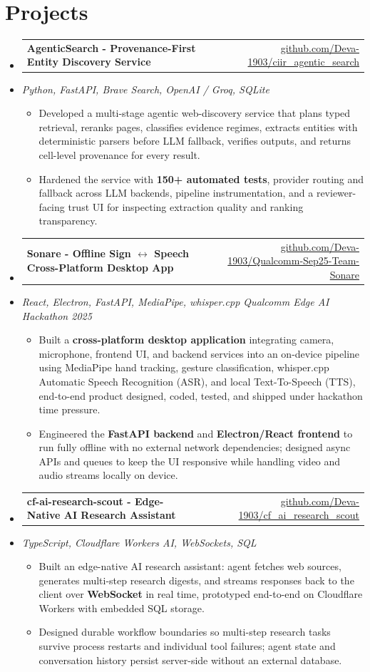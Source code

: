 \documentclass[letterpaper,10pt]{article}
\makeatletter
\newcommand{\resumeItem}[1]{
  \item\small{#1\vspace{-1pt}}
}
\newcommand{\resumeProjectHeading}[2]{
    \item
    \begin{tabular*}{0.985\textwidth}[t]{l@{\extracolsep{\fill}}r}
      \small\textbf{#1} & \small #2 \\
    \end{tabular*}\vspace{-5pt}
}
\newcommand{\resumeProjectSubheading}[1]{
  \vspace{-2pt}\item[] {\small\textcolor{ResumeSlate}{\emph{#1}}}\vspace{-3pt}
}
\newcommand{\resumeSubHeadingListStart}{\begin{itemize}[leftmargin=0.0in, label={}, itemsep=2pt, topsep=2pt]}
\newcommand{\resumeSubHeadingListEnd}{\end{itemize}}
\newcommand{\resumeItemListStart}{\begin{itemize}[leftmargin=0.18in, itemsep=2pt, topsep=1pt]}
\newcommand{\resumeItemListEnd}{\end{itemize}\vspace{-4pt}}
\makeatother
\begin{document}
\section{Projects}
\resumeSubHeadingListStart
  \resumeProjectHeading
    {AgenticSearch - Provenance-First Entity Discovery Service}
    {\href{https://github.com/Deva-1903/ciir_agentic_search}{github.com/Deva-1903/ciir\_agentic\_search}}
  \resumeProjectSubheading{Python, FastAPI, Brave Search, OpenAI / Groq, SQLite}
    \resumeItemListStart
      \resumeItem{Developed a multi-stage agentic web-discovery service that plans typed retrieval, reranks pages, classifies evidence regimes, extracts entities with deterministic parsers before LLM fallback, verifies outputs, and returns cell-level provenance for every result.}
      \resumeItem{Hardened the service with \textbf{150+ automated tests}, provider routing and fallback across LLM backends, pipeline instrumentation, and a reviewer-facing trust UI for inspecting extraction quality and ranking transparency.}
    \resumeItemListEnd
  \resumeProjectHeading
    {Sonare - Offline Sign \(\leftrightarrow\) Speech Cross-Platform Desktop App}
    {\href{https://github.com/Deva-1903/Qualcomm-Sep25-Team-Sonare}{github.com/Deva-1903/Qualcomm-Sep25-Team-Sonare}}
  \resumeProjectSubheading{React, Electron, FastAPI, MediaPipe, whisper.cpp \enspace\textbar\enspace Qualcomm Edge AI Hackathon 2025}
    \resumeItemListStart
      \resumeItem{Built a \textbf{cross-platform desktop application} integrating camera, microphone, frontend UI, and backend services into an on-device pipeline using MediaPipe hand tracking, gesture classification, whisper.cpp Automatic Speech Recognition (ASR), and local Text-To-Speech (TTS), end-to-end product designed, coded, tested, and shipped under hackathon time pressure.}
      \resumeItem{Engineered the \textbf{FastAPI backend} and \textbf{Electron/React frontend} to run fully offline with no external network dependencies; designed async APIs and queues to keep the UI responsive while handling video and audio streams locally on device.}
    \resumeItemListEnd
  \resumeProjectHeading
    {cf-ai-research-scout - Edge-Native AI Research Assistant}
    {\href{https://github.com/Deva-1903/cf_ai_research_scout}{github.com/Deva-1903/cf\_ai\_research\_scout}}
  \resumeProjectSubheading{TypeScript, Cloudflare Workers AI, WebSockets, SQL}
    \resumeItemListStart
      \resumeItem{Built an edge-native AI research assistant: agent fetches web sources, generates multi-step research digests, and streams responses back to the client over \textbf{WebSocket} in real time, prototyped end-to-end on Cloudflare Workers with embedded SQL storage.}
      \resumeItem{Designed durable workflow boundaries so multi-step research tasks survive process restarts and individual tool failures; agent state and conversation history persist server-side without an external database.}
    \resumeItemListEnd
\resumeSubHeadingListEnd
\vspace{-4pt}
\end{document}
